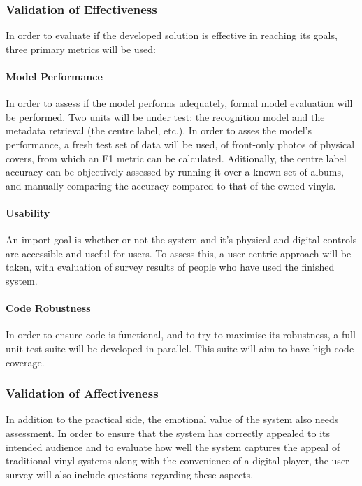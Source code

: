            \subsubsection{Validation of Effectiveness}
    
                In order to evaluate if the developed solution is effective in reaching its goals, three primary metrics will be used:
    
                \paragraph{Model Performance} In order to assess if the model performs adequately, formal model evaluation will be performed. Two units will be under test: the recognition model and the metadata retrieval (the centre label, etc.). In order to asses the model's performance, a fresh test set of data will be used, of front-only photos of physical covers, from which an F1 metric can be calculated. Aditionally, the centre label accuracy can be objectively assessed by running it over a known set of albums, and manually comparing the accuracy compared to that of the owned vinyls.
    
                \paragraph{Usability} An import goal is whether or not the system and it's physical and digital controls are accessible and useful for users. To assess this, a user-centric approach will be taken, with evaluation of survey results of people who have used the finished system.
    
                \paragraph{Code Robustness} In order to ensure code is functional, and to try to maximise its robustness, a full unit test suite will be developed in parallel. This suite will aim to have high code coverage.
        
            \subsubsection{Validation of Affectiveness}
                
                In addition to the practical side, the emotional value of the system also needs assessment. In order to ensure that the system has correctly appealed to its intended audience and to evaluate how well the system captures the appeal of traditional vinyl systems along with the convenience of a digital player, the user survey will also include questions regarding these aspects.
    
